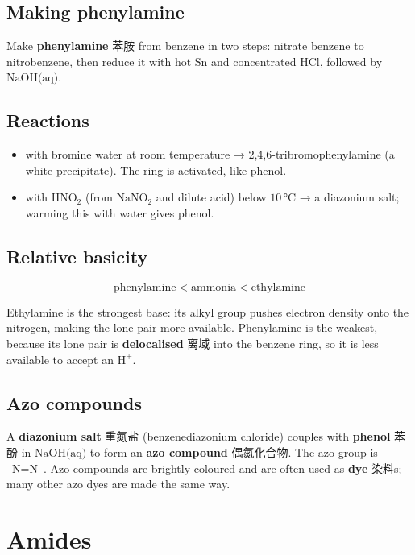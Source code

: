 \documentclass[11pt]{article}
\begin{document}
\subsection*{Making phenylamine}

Make \textbf{phenylamine} 苯胺 from benzene in two steps: nitrate benzene to nitrobenzene, then reduce it with hot $\text{Sn}$ and concentrated $\text{HCl}$, followed by $\text{NaOH(aq)}$.

\subsection*{Reactions}

\begin{itemize}
\item with bromine water at room temperature → 2,4,6-tribromophenylamine (a white precipitate). The ring is activated, like phenol.

\item with $\text{HNO}_2$ (from $\text{NaNO}_2$ and dilute acid) below $10\,°\text{C}$ → a diazonium salt; warming this with water gives phenol.

\end{itemize}

\subsection*{Relative basicity}

\[
\text{phenylamine} < \text{ammonia} < \text{ethylamine}
\]

Ethylamine is the strongest base: its alkyl group pushes electron density onto the nitrogen, making the lone pair more available. Phenylamine is the weakest, because its lone pair is \textbf{delocalised} 离域 into the benzene ring, so it is less available to accept an $\text{H}^+$.

\subsection*{Azo compounds}

A \textbf{diazonium salt} 重氮盐 (benzenediazonium chloride) couples with \textbf{phenol} 苯酚 in $\text{NaOH(aq)}$ to form an \textbf{azo compound} 偶氮化合物. The azo group is $\text{–N=N–}$. Azo compounds are brightly coloured and are often used as \textbf{dye} 染料s; many other azo dyes are made the same way.

\section*{Amides}
\end{document}
